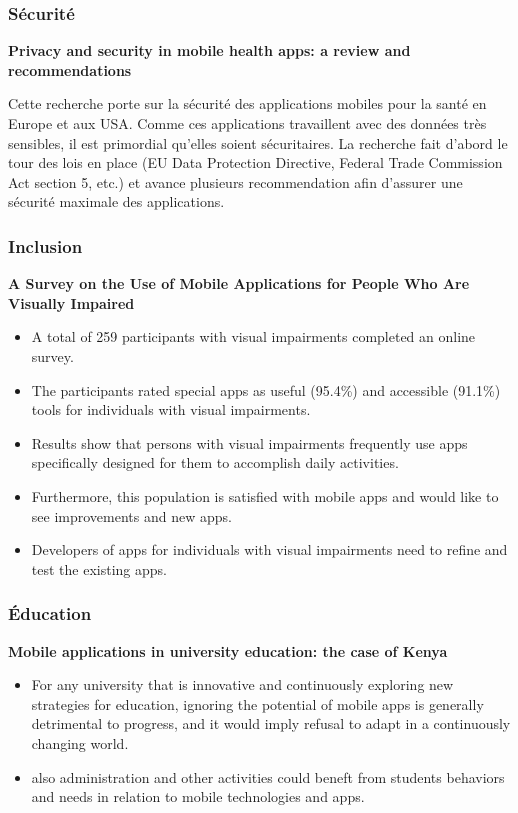 		\subsubsection{Sécurité}
		{\bfseries Privacy and security in mobile health apps: a review and recommendations}
		
		Cette recherche porte sur la sécurité des applications mobiles pour la santé en Europe et aux USA. Comme ces applications travaillent avec des données très sensibles, il est primordial qu'elles soient sécuritaires. La recherche fait d'abord le tour des lois en place (EU Data Protection Directive, Federal Trade Commission Act section 5, etc.) et avance plusieurs recommendation afin d'assurer une sécurité maximale des applications.
		
		
		\subsubsection{Inclusion}
		{\bfseries A Survey on the Use of Mobile Applications for People Who Are Visually Impaired}
		
		\begin{itemize}
			\item A total of 259 participants with visual impairments completed an online survey. 
			\item The participants rated special apps as useful (95.4\%) and accessible (91.1\%) tools for individuals with visual impairments.
			\item Results show that persons with visual impairments frequently use apps specifically designed for them to accomplish daily activities.
			\item Furthermore, this population is satisfied with mobile apps and would like to see improvements and new apps.
			\item Developers of apps for individuals with visual impairments need to refine and test the existing apps. 
		\end{itemize}
		
		\subsubsection{Éducation}
		{\bfseries Mobile applications in university education: the case of Kenya}
		
		\begin{itemize}
			\item For any university that is innovative and continuously exploring new strategies for education, ignoring the potential of mobile apps is generally detrimental to progress, and it would imply refusal to adapt in a continuously changing world. 
			\item also administration and other activities could beneft from students behaviors and needs in relation to mobile technologies and apps.
		\end{itemize}
	
